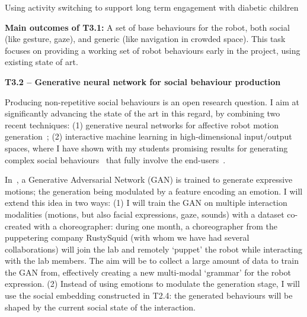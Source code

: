 Using activity switching to support long term engagement with diabetic children~\cite{coninx2016towards}

\begin{framed}
    {\noindent\bf Main outcomes of T3.1:} A set of base behaviours for the robot, both
    social (like gesture,  gaze), and generic (like navigation in crowded
    space). This task focuses on providing a working set of robot behaviours
    early in the project, using existing state of art.
\end{framed}


\textbf{T3.2 -- Generative neural network for social behaviour production}

Producing non-repetitive social behaviours is an open research question. I aim
at significantly advancing the state of the art in this regard, by combining two
recent techniques: (1) generative neural networks for affective robot motion
generation~\cite{marmpena2019generating,suguitan2020moveae}; (2) interactive
machine learning in high-dimensional input/output spaces, where I have shown
with my students promising results for generating complex social
behaviours~\cite{senft2019teaching, winkle2020couch} that fully involve the
end-users~\cite{winkle2018social}.

In~\cite{suguitan2020moveae}, a Generative Adversarial Network (GAN) is trained
to generate expressive motions; the generation being modulated by a feature
encoding an emotion. I will extend this idea in two ways: (1) I will train the GAN on multiple
interaction modalities (motions, but also facial expressions, gaze, sounds) with
a dataset co-created with a choreographer: during one month, a choreographer from the
puppetering company RustySquid (with whom we have had several collaborations)
will join the lab and remotely `puppet' the robot while interacting with the lab
members. The aim will be to collect a large amount of data to train the GAN
from, effectively creating a new multi-modal `grammar' for the robot expression.
(2) Instead of using emotions to modulate the generation stage, I will use the
social embedding constructed in T2.4: the generated behaviours will be shaped by
the current social state of the interaction.

%

